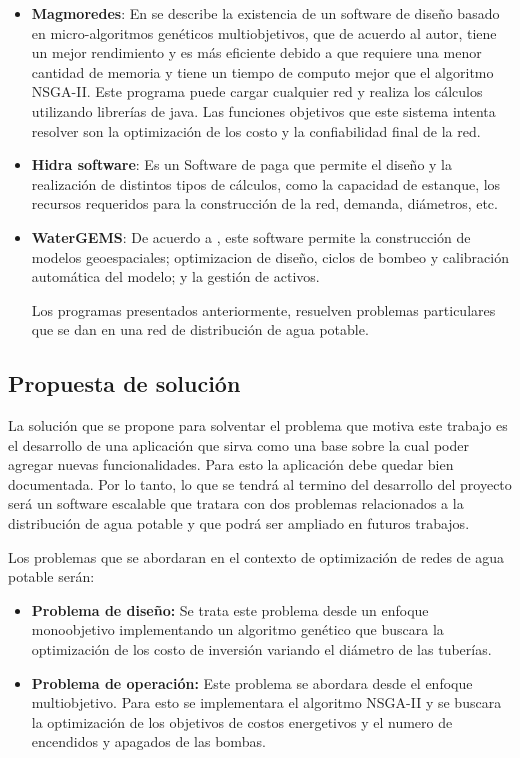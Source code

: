 \documentclass[11pt,letterpaper]{article}
\begin{document}
\begin{itemize}
	\item \textbf{Magmoredes}: En \cite{Edwin2017} se describe la existencia de un software de diseño basado en micro-algoritmos genéticos multiobjetivos, que de acuerdo al autor, tiene un mejor rendimiento y es más eficiente debido a que requiere una menor cantidad de memoria y tiene un tiempo de computo mejor que el algoritmo NSGA-II. Este programa puede cargar cualquier red y realiza los cálculos utilizando librerías de java. Las funciones objetivos que este sistema intenta resolver son la optimización de los costo y la confiabilidad final de la red.
	
	
	\item \textbf{Hidra software}: Es un Software de paga que permite el diseño y la realización de distintos tipos de cálculos, como la capacidad de estanque, los recursos requeridos para la construcción de la red, demanda, diámetros, etc.
	
	
	\item \textbf{WaterGEMS}: De acuerdo a \cite{Bentley2017}, este software permite la  construcción de modelos geoespaciales; optimizacion de diseño, ciclos de bombeo y calibración automática del modelo; y la  gestión de activos. 
	
	Los programas presentados anteriormente, resuelven problemas particulares que se dan en una red de distribución de agua potable.
\end{itemize}

\subsection{Propuesta de solución}

La solución que se propone para solventar el problema que motiva este trabajo es el desarrollo de una aplicación que sirva como una base sobre la cual poder agregar nuevas funcionalidades. Para esto la aplicación debe quedar bien documentada. Por lo tanto, lo que se tendrá al termino del desarrollo del proyecto será un software escalable que tratara con dos problemas relacionados a la distribución de agua potable y que podrá ser ampliado en futuros trabajos.

Los problemas que se abordaran en el contexto de optimización de redes de agua potable serán:
\begin{itemize}
	\item \textbf{Problema de diseño:} Se trata este problema desde un enfoque monoobjetivo implementando un algoritmo genético que buscara la optimización de los costo de inversión variando el diámetro de las tuberías.  
	\item \textbf{Problema de operación:} Este problema se abordara desde el enfoque multiobjetivo. Para esto se implementara el algoritmo NSGA-II y se buscara la optimización de los objetivos de costos energetivos y el numero de encendidos y apagados de las bombas.
\end{itemize}
\end{document}
